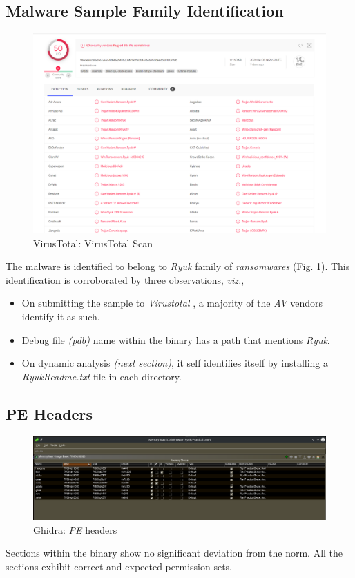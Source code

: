 \documentclass[10pt,a4paper]{article}
\begin{document}
	\subsection{Malware Sample Family Identification}
	\begin{figure}[!htbp]%
		\centering
		\includegraphics[width=\columnwidth]{pics/virustotal.png}
		\caption{VirusTotal: VirusTotal Scan}
		\label{virustotal}
	\end{figure}
	The malware is identified to belong to \textit{Ryuk} family of \textit{ransomwares} (Fig. \ref{virustotal}).
	This identification is corroborated by three observations, \textit{viz.},
	\begin{itemize}
	\vspace{-1em}
		\item On submitting the sample to \textit{Virustotal} \cite{virustotal}, a majority of the \textit{AV} vendors identify it as such.
		\item Debug file \textit{(pdb)} name within the binary has a path that mentions \textit{Ryuk}.
		\item On dynamic analysis \textit{(next section)}, it self identifies itself by installing a \textit{RyukReadme.txt} file in each directory.
	\end{itemize}

	\subsection{PE Headers}
	\begin{figure}[!htbp]%
		\centering
		\includegraphics[width=\columnwidth]{pics/peHeaders.png}
		\caption{Ghidra: \textit{PE} headers}
		\label{peHeaders}
	\end{figure}
	Sections within the binary show no significant deviation from the norm.
	All the sections exhibit correct and expected permission sets.
\end{document}
